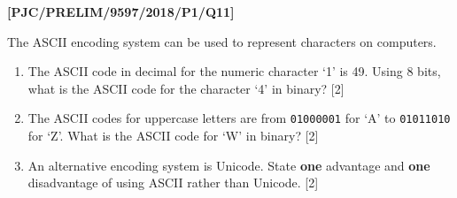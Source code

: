 \item \textbf{{[}PJC/PRELIM/9597/2018/P1/Q11{]} }

The ASCII encoding system can be used to represent characters on computers. 
\begin{enumerate}
\item The ASCII code in decimal for the numeric character \textquoteleft 1\textquoteright{}
is 49. Using 8 bits, what is the ASCII code for the character \textquoteleft 4\textquoteright{}
in binary? \hfill{}{[}2{]}
\item The ASCII codes for uppercase letters are from \texttt{01000001} for
\textquoteleft A\textquoteright{} to \texttt{01011010} for \textquoteleft Z\textquoteright .
What is the ASCII code for \textquoteleft W\textquoteright{} in binary?
\hfill{}{[}2{]}
\item An alternative encoding system is Unicode. State \textbf{one} advantage
and \textbf{one} disadvantage of using ASCII rather than Unicode.
\hfill{} {[}2{]}
\end{enumerate}